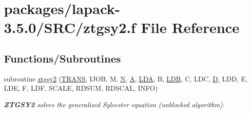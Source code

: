 \hypertarget{ztgsy2_8f}{}\section{packages/lapack-\/3.5.0/\+S\+R\+C/ztgsy2.f File Reference}
\label{ztgsy2_8f}
\subsection*{Functions/\+Subroutines}
\begin{DoxyCompactItemize}
\item 
subroutine \hyperlink{group__complex16SYauxiliary_gab24c8af7cc49b5eef89718d4d6a889e3}{ztgsy2} (\hyperlink{superlu__enum__consts_8h_a0c4e17b2d5cea33f9991ccc6a6678d62a1f61e3015bfe0f0c2c3fda4c5a0cdf58}{T\+R\+A\+N\+S}, I\+J\+O\+B, M, \hyperlink{polmisc_8c_a0240ac851181b84ac374872dc5434ee4}{N}, \hyperlink{classA}{A}, \hyperlink{example__user_8c_ae946da542ce0db94dced19b2ecefd1aa}{L\+D\+A}, B, \hyperlink{example__user_8c_a50e90a7104df172b5a89a06c47fcca04}{L\+D\+B}, C, L\+D\+C, \hyperlink{odrpack_8h_a7dae6ea403d00f3687f24a874e67d139}{D}, L\+D\+D, E, L\+D\+E, F, L\+D\+F, S\+C\+A\+L\+E, R\+D\+S\+U\+M, R\+D\+S\+C\+A\+L, I\+N\+F\+O)
\begin{DoxyCompactList}\small\item\em {\bfseries Z\+T\+G\+S\+Y2} solves the generalized Sylvester equation (unblocked algorithm). \end{DoxyCompactList}\end{DoxyCompactItemize}
